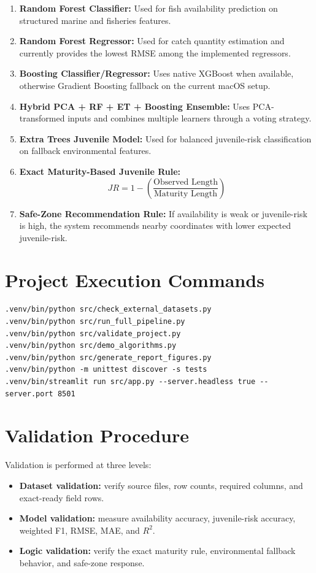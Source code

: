 \documentclass[12pt,a4paper]{report}
\begin{document}
\begin{enumerate}[leftmargin=1.5cm]
    \item \textbf{Random Forest Classifier:} Used for fish availability prediction on structured marine and fisheries features.
    \item \textbf{Random Forest Regressor:} Used for catch quantity estimation and currently provides the lowest RMSE among the implemented regressors.
    \item \textbf{Boosting Classifier/Regressor:} Uses native XGBoost when available, otherwise Gradient Boosting fallback on the current macOS setup.
    \item \textbf{Hybrid PCA + RF + ET + Boosting Ensemble:} Uses PCA-transformed inputs and combines multiple learners through a voting strategy.
    \item \textbf{Extra Trees Juvenile Model:} Used for balanced juvenile-risk classification on fallback environmental features.
    \item \textbf{Exact Maturity-Based Juvenile Rule:}
    \[
    JR = 1 - \left(\frac{\text{Observed Length}}{\text{Maturity Length}}\right)
    \]
    \item \textbf{Safe-Zone Recommendation Rule:} If availability is weak or juvenile-risk is high, the system recommends nearby coordinates with lower expected juvenile-risk.
\end{enumerate}

\chapter{Project Execution Commands}
\begin{verbatim}
.venv/bin/python src/check_external_datasets.py
.venv/bin/python src/run_full_pipeline.py
.venv/bin/python src/validate_project.py
.venv/bin/python src/demo_algorithms.py
.venv/bin/python src/generate_report_figures.py
.venv/bin/python -m unittest discover -s tests
.venv/bin/streamlit run src/app.py --server.headless true --server.port 8501
\end{verbatim}

\chapter{Validation Procedure}
Validation is performed at three levels:
\begin{itemize}[leftmargin=1.5cm]
    \item \textbf{Dataset validation:} verify source files, row counts, required columns, and exact-ready field rows.
    \item \textbf{Model validation:} measure availability accuracy, juvenile-risk accuracy, weighted F1, RMSE, MAE, and $R^2$.
    \item \textbf{Logic validation:} verify the exact maturity rule, environmental fallback behavior, and safe-zone response.
\end{itemize}
\end{document}
